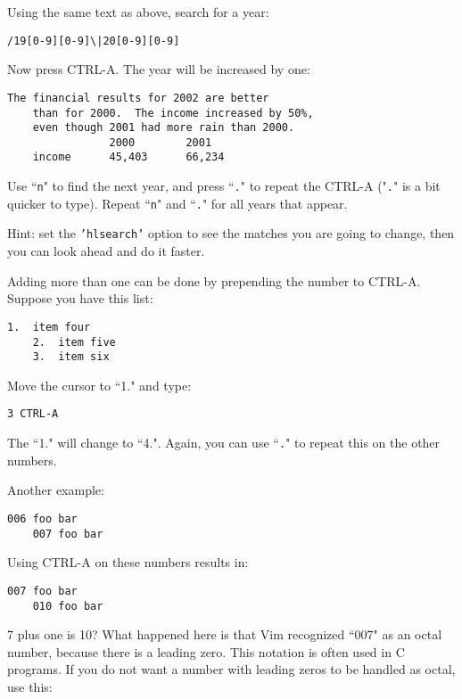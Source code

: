 Using the same text as above, search for a year:

\begin{Verbatim}[samepage=true]
 /19[0-9][0-9]\|20[0-9][0-9]
\end{Verbatim}

Now press CTRL-A.
The year will be increased by one:

\begin{Verbatim}[samepage=true]
    The financial results for 2002 are better
    than for 2000.  The income increased by 50%,
    even though 2001 had more rain than 2000.
                2000        2001
    income      45,403      66,234
\end{Verbatim}

Use ``\texttt{n}" to find the next year, and press ``\texttt{.}" to repeat the CTRL-A ("\texttt{.}" is a bit quicker to type).
Repeat ``\texttt{n}" and ``\texttt{.}" for all years that appear.

Hint: set the \texttt{'hlsearch'} option to see the matches you are going to change, then you can look ahead and do it faster.

Adding more than one can be done by prepending the number to CTRL-A.
Suppose you have this list:

\begin{Verbatim}[samepage=true]
    1.  item four
    2.  item five
    3.  item six
\end{Verbatim}

Move the cursor to ``1." and type:

\begin{Verbatim}[samepage=true]
 3 CTRL-A
\end{Verbatim}

The ``1." will change to ``4.".
Again, you can use ``\texttt{.}" to repeat this on the other numbers.

Another example:

\begin{Verbatim}[samepage=true]
    006 foo bar
    007 foo bar
\end{Verbatim}

Using CTRL-A on these numbers results in:

\begin{Verbatim}[samepage=true]
    007 foo bar
    010 foo bar
\end{Verbatim}

7 plus one is 10?  What happened here is that Vim recognized ``007" as an octal number, because there is a leading zero.
This notation is often used in C programs.
If you do not want a number with leading zeros to be handled as octal, use this:

